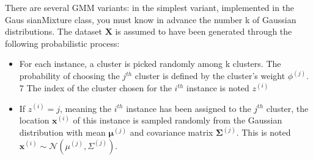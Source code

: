 \documentclass[french]{article}
\begin{document}
There are several GMM variants: in the simplest variant, implemented in the Gaus sianMixture class, you must know in advance the number k of Gaussian distributions. The dataset $\bm{X}$ is assumed to have been generated through the following probabilistic process:

\begin{itemize}
    \item For each instance, a cluster is picked randomly among k clusters. The probability of choosing the $j^{th}$ cluster is defined by the cluster’s weight $\phi^{(j)}$. 7 The index of the cluster chosen for the $i^{th}$ instance is noted $z^{(i)}$
    \item If $z^{(i)} = j$, meaning the $i^{th}$ instance has been assigned to the $j^{th}$ cluster, the location
$\bm{x}^{(i)}$ of this instance is sampled randomly from the Gaussian distribution with
mean $\bm{\mu}^{(j)}$ and covariance matrix $\bm{\Sigma}^{(j)}$. This is noted $\bm{x}^{(i)} \sim \mathscr{N}(\mu^{(j)}, \Sigma^{(j)})$.
\end{itemize}
\end{document}
